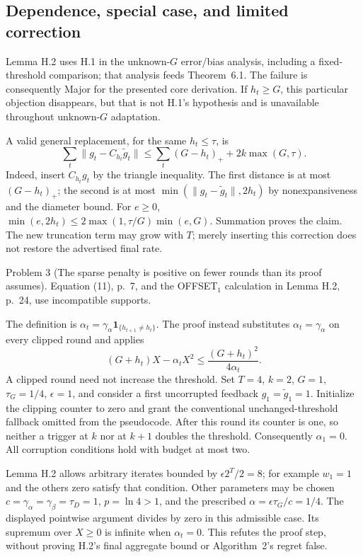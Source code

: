 \documentclass[10pt]{article}
\begin{document}
\subsection*{Dependence, special case, and limited correction}
Lemma H.2 uses H.1 in the unknown-\(G\) error/bias analysis, including a fixed-threshold comparison; that analysis feeds Theorem 6.1. The failure is consequently Major for the presented core derivation. If \(h_t\ge G\), this particular objection disappears, but that is not H.1’s hypothesis and is unavailable throughout unknown-\(G\) adaptation.\par
A valid general replacement, for the same \(h_t\le\tau\), is \[\sum_t\|g_t-C_{h_t}\widetilde g_t\|
 \le \sum_t(G-h_t)_+ +2k\max(G,\tau).\] Indeed, insert \(C_{h_t}g_t\) by the triangle inequality. The first distance is at most \((G-h_t)_+\); the second is at most \(\min(\|g_t-\widetilde g_t\|,2h_t)\) by nonexpansiveness and the diameter bound. For \(e\ge0\), \(\min(e,2h_t)\le2\max(1,\tau/G)\min(e,G)\). Summation proves the claim. The new truncation term may grow with \(T\); merely inserting this correction does not restore the advertised final rate.\par
Problem 3 (The sparse penalty is positive on fewer rounds than its proof assumes).  Equation (11), p. 7, and the OFFSET\(_1\) calculation in Lemma H.2, p. 24, use incompatible supports.\par
The definition is \(\alpha_t=\gamma_\alpha\mathbf1_{\{h_{t+1}\ne h_t\}}\). The proof instead substitutes \(\alpha_t=\gamma_\alpha\) on every clipped round and applies \[(G+h_t)X-\alpha_tX^2\le \frac{(G+h_t)^2}{4\alpha_t}.\] A clipped round need not increase the threshold. Set \(T=4\), \(k=2\), \(G=1\), \(\tau_G=1/4\), \(\epsilon=1\), and consider a first uncorrupted feedback \(g_1=\widetilde g_1=1\). Initialize the clipping counter to zero and grant the conventional unchanged-threshold fallback omitted from the pseudocode. After this round its counter is one, so neither a trigger at \(k\) nor at \(k+1\) doubles the threshold. Consequently \(\alpha_1=0\). All corruption conditions hold with budget at most two.\par
Lemma H.2 allows arbitrary iterates bounded by \(\epsilon 2^T/2=8\); for example \(w_1=1\) and the others zero satisfy that condition. Other parameters may be chosen \(c=\gamma_\alpha=\gamma_\beta=\tau_D=1\), \(p=\ln4>1\), and the prescribed \(\alpha=\epsilon\tau_G/c=1/4\). The displayed pointwise argument divides by zero in this admissible case. Its supremum over \(X\ge0\) is infinite when \(\alpha_t=0\). This refutes the proof step, without proving H.2’s final aggregate bound or Algorithm 2’s regret false.\par
\end{document}
